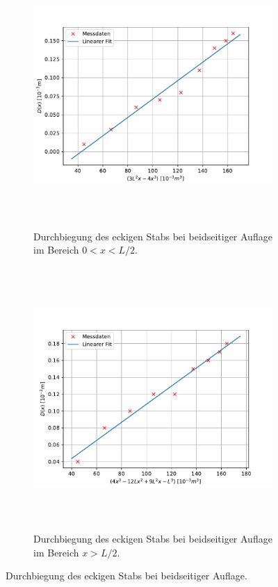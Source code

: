 \begin{figure}[H]
  \begin{subfigure}{\textwidth}
  \centering
  \includegraphics[height=10cm]{content/plots/eckb1.pdf}
  \caption{Durchbiegung des eckigen Stabs bei beidseitiger Auflage im Bereich $0<x<L/2$.}
  \label{fig:LinRegeckb1}
  \end{subfigure}
  \begin{subfigure}{\textwidth}
  \centering
  \includegraphics[height=10cm]{content/plots/eckb2.pdf}
  \caption{Durchbiegung des eckigen Stabs bei beidseitiger Auflage im Bereich $x>L/2$.}
  \label{fig:LinRegeckb2}
  \end{subfigure}
  \caption{Durchbiegung des eckigen Stabs bei beidseitiger Auflage.}
  \label{fig:LinRegeckb}
\end{figure}


